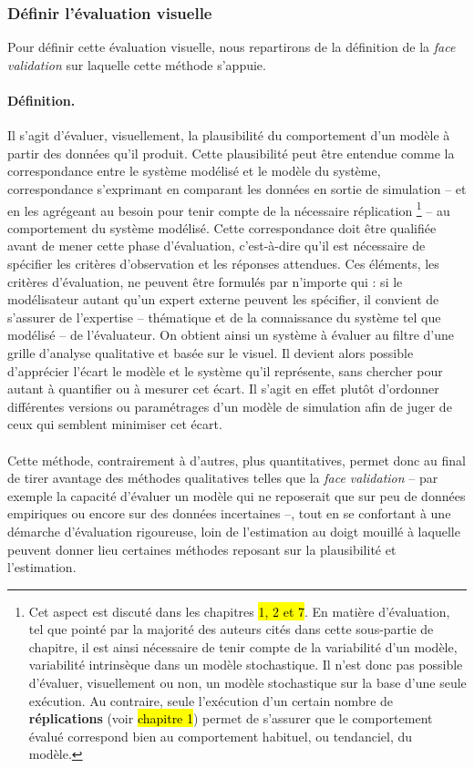 \subsubsection{Définir l'évaluation visuelle} Pour définir cette évaluation visuelle, nous repartirons de la définition de la \textit{face validation} sur laquelle cette méthode s'appuie.

\paragraph{Définition.} Il s'agit d'évaluer, visuellement, la plausibilité du comportement d'un modèle à partir des données qu'il produit.
Cette plausibilité peut être entendue comme la correspondance entre le système modélisé et le modèle du système, correspondance s'exprimant en comparant les données en sortie de simulation -- et en les agrégeant au besoin pour tenir compte de la nécessaire réplication
\footnote{
	Cet aspect est discuté dans les chapitres \hl{1, 2 et 7}.
	En matière d'évaluation, tel que pointé par la majorité des auteurs cités dans cette sous-partie de chapitre, il est ainsi nécessaire de tenir compte de la variabilité d'un modèle, variabilité intrinsèque dans un modèle stochastique.
	Il n'est donc pas possible d'évaluer, visuellement ou non, un modèle stochastique sur la base d'une seule exécution. Au contraire, seule l'exécution d'un certain nombre de \textbf{réplications} (voir \hl{chapitre 1}) permet de s'assurer que le comportement évalué correspond bien au comportement habituel, ou tendanciel, du modèle.
} -- au comportement du système modélisé.
Cette correspondance doit être qualifiée avant de mener cette phase d'évaluation, c'est-à-dire qu'il est nécessaire de spécifier les critères d'observation et les réponses attendues.
Ces éléments, les critères d'évaluation, ne peuvent être formulés par n'importe qui : si le modélisateur autant qu'un expert externe peuvent les spécifier, il convient de s'assurer de l'expertise -- thématique et de la connaissance du système tel que modélisé -- de l'évaluateur.
On obtient ainsi un système à évaluer au filtre d'une grille d'analyse qualitative et basée sur le visuel.
Il devient alors possible d'apprécier l'écart le modèle et le système qu'il représente, sans chercher pour autant à quantifier ou à mesurer cet écart. 
Il s'agit en effet plutôt d'ordonner différentes versions ou paramétrages d'un modèle de simulation afin de juger de ceux qui semblent minimiser cet écart.

\paragraph*{}Cette méthode, contrairement à d'autres, plus quantitatives, permet donc au final de tirer avantage des méthodes qualitatives telles que la \textit{face validation} -- par exemple la capacité d'évaluer un modèle qui ne reposerait que sur peu de données empiriques ou encore sur des données incertaines --, tout en se confortant à une démarche d'évaluation rigoureuse, loin de l'estimation \og au doigt mouillé\fg{} à laquelle peuvent donner lieu certaines méthodes reposant sur la plausibilité et l'estimation.

